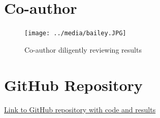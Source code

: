 \documentclass{article}
\begin{document}
\newpage
\appendix

\section{Co-author}

\begin{figure}[H]
    \centering
    \texttt{[image: ../media/bailey.JPG]}
    \caption{Co-author diligently reviewing results}
    \label{fig:bailey}
\end{figure}

\section{GitHub Repository}

\href{https://github.com/DuncanB6/ml_pulse_detection}{Link to GitHub repository with code and results} 
\end{document}
